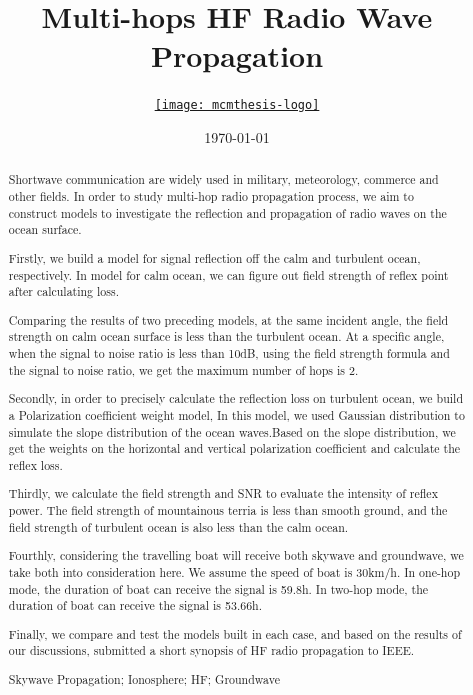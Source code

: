 \documentclass{mcmthesis}
\title{Multi-hops HF Radio Wave Propagation}
\author{\small \href{http://www.latexstudio.net/}
  {\texttt{[image: mcmthesis-logo]}}}
\date{\today}
\begin{document}
\begin{abstract}
Shortwave communication are widely used in military, meteorology, commerce and other fields. In order to study multi-hop radio propagation process, we aim to construct models to investigate the reflection and propagation of radio waves on the ocean surface.

Firstly, we build a model for signal reflection off the calm and turbulent ocean, respectively. In model for calm ocean, we can figure out field strength of reflex point after calculating loss. 

Comparing the results of two preceding models, at the same incident angle, the field strength on calm ocean surface is less than the turbulent ocean. At a specific angle, when the signal to noise ratio is less than 10dB, using the field strength formula and the signal to noise ratio, we get the maximum number of hops is 2.

Secondly, in order to precisely calculate the reflection loss on turbulent ocean, we build a Polarization coefficient weight model, In this model, we used Gaussian distribution to simulate the slope distribution of the ocean waves.Based on the slope distribution, we get the weights on the horizontal and vertical polarization coefficient and calculate the reflex loss.

Thirdly, we calculate the field strength and SNR to evaluate the intensity of reflex power. The field strength of mountainous terria is less than smooth ground, and the field strength of turbulent ocean is also less than the calm ocean.

Fourthly, considering the travelling boat will receive both skywave and groundwave, we take both into consideration here. We assume the speed of boat is 30km/h. In one-hop mode, the duration of boat can receive the signal is 59.8h. In two-hop mode, the duration of boat can receive the signal is 53.66h.

Finally, we compare and test the models built in each case, and based on the results of our discussions, submitted a short synopsis of HF radio propagation to IEEE.
\begin{keywords}
Skywave Propagation; Ionosphere; HF; Groundwave 
\end{keywords}
\end{abstract}
\maketitle
\tableofcontents
\newpage
\end{document}
